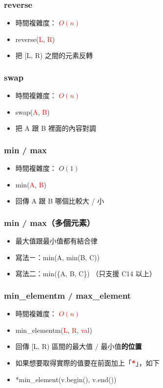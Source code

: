 \documentclass[mathserif]{beamer}
\begin{document}
\begin{frame}
    \frametitle{reverse}
    \begin{itemize}
        \item 時間複雜度： \textcolor{red}{\textbf{$O(n)$}}
        \item reverse(\textcolor{red}{L}, \textcolor{red}{R})
        \item 把 [L, R) 之間的元素反轉
    \end{itemize}
\end{frame}

\begin{frame}
    \frametitle{swap}
    \begin{itemize}
        \item 時間複雜度： \textcolor{red}{\textbf{$O(n)$}}
        \item swap(\textcolor{red}{A}, \textcolor{red}{B})
        \item 把 A 跟 B 裡面的內容對調
    \end{itemize}
\end{frame}

\begin{frame}
    \frametitle{min / max}
    \begin{itemize}
        \item 時間複雜度： $O(1)$
        \item min(\textcolor{red}{A}, \textcolor{red}{B})
        \item 回傳 A 跟 B 哪個比較大 / 小
    \end{itemize}
\end{frame}

\begin{frame}
    \frametitle{min / max（多個元素）}
    \begin{itemize}
        \item 最大值跟最小值都有結合律
        \item 寫法ㄧ：min(A, min(B, C))
        \item 寫法二：min(\{A, B, C\}) （只支援 C14 以上）
    \end{itemize}
\end{frame}

\begin{frame}
    \frametitle{min\_elementm / max\_element}
    \begin{itemize}
        \item 時間複雜度： \textcolor{red}{\textbf{$O(n)$}}
        \item min\_elementm(\textcolor{red}{L}, \textcolor{red}{R}, \textcolor{red}{val})
        \item 回傳 [L, R) 區間的最大值 / 最小值\textbf{的位置}
        \vspace{0.5cm}
        \item 如果想要取得實際的值要在前面加上「\textcolor{red}{\textbf{*}}」，如下
        \item *min\_element(v.begin(), v.end())
    \end{itemize}
\end{frame}
\end{document}
